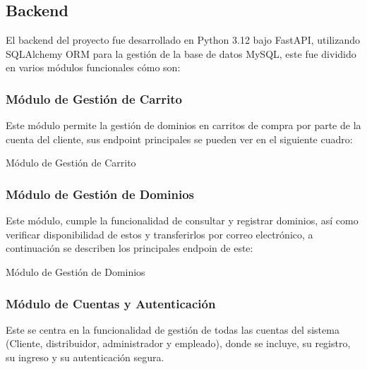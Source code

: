 
\subsection{Backend}
El backend del proyecto fue desarrollado en Python 3.12 bajo FastAPI, utilizando SQLAlchemy ORM para la gestión de la base de datos MySQL, este fue dividido en varios módulos funcionales cómo son:
\subsubsection{Módulo de Gestión de Carrito}
Este módulo permite la gestión de dominios en carritos de compra por parte de la cuenta del cliente, sus endpoint principales se pueden ver en el siguiente cuadro:


\begin{center}
    \begin{table}[H]
    \caption{Módulo de Gestión de Carrito}
    \end{table}
\end{center}


\subsubsection{Módulo de Gestión de Dominios}
Este módulo, cumple la funcionalidad de consultar y registrar dominios, así como verificar disponibilidad de estos y transferirlos por correo electrónico, a continuación se describen los principales endpoin de este:

\begin{center}
    \begin{table}[H]
    \caption{Módulo de Gestión de Dominios}
    \end{table}
\end{center}

\subsubsection{Módulo de Cuentas y Autenticación}
Este se centra en la funcionalidad de gestión de todas las cuentas del sistema (Cliente, distribuidor, administrador y empleado), donde se incluye, su registro, su ingreso  y su autenticación segura.

